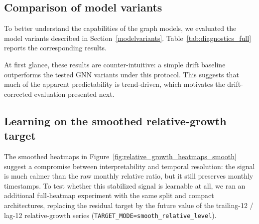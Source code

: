 \documentclass[pdflatex,sn-basic]{sn-jnl}
\begin{document}
\subsection{Comparison of model variants}
To better understand the capabilities of the graph models, we evaluated the model variants described in Section~\ref{modelvariants}. Table~\ref{tab:diagnostics_full} reports the corresponding results.
\begin{table}[H]
\centering
\caption{Evaluation results under \texttt{TARGET\_MODE=residual} from the full-heatmap run (\texttt{run\_id=exp\_residual\_diag\_fullheatmap\_20260307}, 532 active keywords).}
\label{tab:diagnostics_full}
\end{table}
At first glance, these results are counter-intuitive: a simple drift baseline outperforms the tested GNN variants under this protocol. This suggests that much of the apparent predictability is trend-driven, which motivates the drift-corrected evaluation presented next. 

\subsection{Learning on the smoothed relative-growth target}
The smoothed heatmaps in Figure~\ref{fig:relative_growth_heatmaps_smooth} suggest a compromise between interpretability and temporal resolution: the signal is much calmer than the raw monthly relative ratio, but it still preserves monthly timestamps. To test whether this stabilized signal is learnable at all, we ran an additional full-heatmap experiment with the same split and compact architectures, replacing the residual target by the future value of the trailing-12 / lag-12 relative-growth series (\texttt{TARGET\_MODE=smooth\_relative\_level}).
\end{document}
